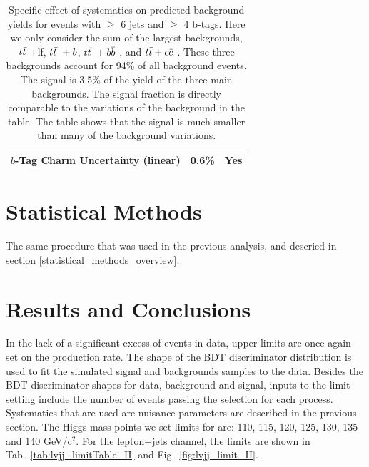 \begin{table}[hbtp]
\begin{tabular}{lcc}
$b$-Tag Charm Uncertainty (linear)              & 0.6\%  & Yes     \\
\hline\hline
\end{tabular}
\caption{ Specific effect of systematics on predicted background yields for
events with $\geq$ 6 jets and $\geq$ 4 b-tags. Here we only consider
the sum of the largest backgrounds, $t{\bar{t}}~$+lf, $t{\bar{t}}~+b$, $t{\bar{t}}~+b{\bar{b}}~$, and
$t{\bar{t}}+c{\bar{c}}~$. These three backgrounds account for 94\% of all
background events.  The signal is 3.5\% of the yield of the three main
backgrounds. The signal fraction is directly comparable to the
variations of the background in the table. The table shows that the
signal is much smaller than many of the background variations. }
\label{tab:syst6j4t}
\end{table}



\section{Statistical Methods}
\label{statistical_methods_II_overview}

\par The same procedure that was used in the previous analysis, and
descried in section \ref{statistical_methods_overview}.  


\section{Results and Conclusions}
\label{results_and_conclusions_II_overview}

\par In the lack of a significant excess of events in data, upper
limits are once again set on the \ttH production rate.  The shape of
the BDT discriminator distribution is used to fit the simulated signal
and backgrounds samples to the data.  Besides the BDT discriminator
shapes for data, background and signal, inputs to the limit setting
include the number of events passing the selection for each
process. Systematics that are used are nuisance parameters are
described in the previous section.  The Higgs mass points we
set limits for are: 110, 115, 120, 125, 130, 135 and 140 GeV/c$^2$.
For the lepton+jets channel, the limits are shown in
Tab.~\ref{tab:lvjj_limitTable_II} and Fig.~\ref{fig:lvjj_limit_II}.    

